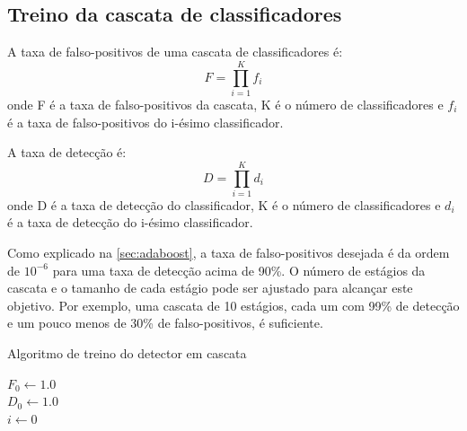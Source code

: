 \subsection{Treino da cascata de classificadores}

A taxa de falso-positivos de uma cascata de classificadores é:
%
\begin{equation} \label{eq:tax_falso_positivos}
F = \prod_{i=1}^{K} f_{i}
\end{equation}
%
onde F é a taxa de falso-positivos da cascata, K é o número de classificadores e $f_{i}$ é a taxa de falso-positivos do i-ésimo classificador.

A taxa de detecção é:
%
\begin{equation} \label{eq:taxa_deteccao}
D = \prod_{i=1}^{K} d_{i}
\end{equation}
%
onde D é a taxa de detecção do classificador, K é o número de classificadores e $d_{i}$ é a taxa de detecção do i-ésimo classificador.

Como explicado na \autoref{sec:adaboost}, a taxa de falso-positivos desejada é da ordem de $10^{-6}$ para uma taxa de detecção acima de 90\%.
O número de estágios da cascata e o tamanho de cada estágio pode ser ajustado para alcançar este objetivo.
Por exemplo, uma cascata de 10 estágios, cada um com 99\% de detecção e um pouco menos de 30\% de falso-positivos, é suficiente.

\begin{algorithm}[htbp]
\caption{Algoritmo de treino do detector em cascata}
\label{alg:train_cascade}
\SetAlgoLined
\LinesNumbered
{}
\BlankLine
$F_{0} \leftarrow 1.0$\\
$D_{0} \leftarrow 1.0$\\
$i \leftarrow 0$
\end{algorithm} 

